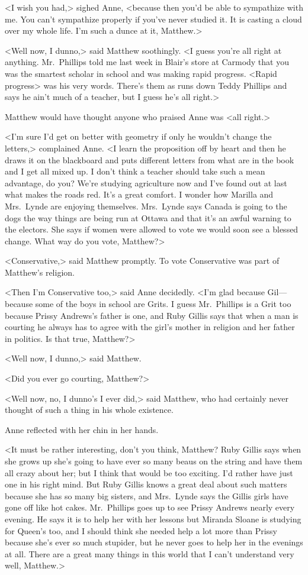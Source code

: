 <I wish you had,> sighed Anne, <because then you'd be able to sympathize with me. You can't sympathize properly if you've never studied it. It is casting a cloud over my whole life. I'm such a dunce at it, Matthew.>

<Well now, I dunno,> said Matthew soothingly. <I guess you're all right at anything. Mr.~Phillips told me last week in Blair's store at Carmody that you was the smartest scholar in school and was making rapid progress. <Rapid progress> was his very words. There's them as runs down Teddy Phillips and says he ain't much of a teacher, but I guess he's all right.>

Matthew would have thought anyone who praised Anne was <all right.>

<I'm sure I'd get on better with geometry if only he wouldn't change the letters,> complained Anne. <I learn the proposition off by heart and then he draws it on the blackboard and puts different letters from what are in the book and I get all mixed up. I don't think a teacher should take such a mean advantage, do you? We're studying agriculture now and I've found out at last what makes the roads red. It's a great comfort. I wonder how Marilla and Mrs.~Lynde are enjoying themselves. Mrs.~Lynde says Canada is going to the dogs the way things are being run at Ottawa and that it's an awful warning to the electors. She says if women were allowed to vote we would soon see a blessed change. What way do you vote, Matthew?>

<Conservative,> said Matthew promptly. To vote Conservative was part of Matthew's religion.

<Then I'm Conservative too,> said Anne decidedly. <I'm glad because Gil—because some of the boys in school are Grits. I guess Mr.~Phillips is a Grit too because Prissy Andrews's father is one, and Ruby Gillis says that when a man is courting he always has to agree with the girl's mother in religion and her father in politics. Is that true, Matthew?>

<Well now, I dunno,> said Matthew.

<Did you ever go courting, Matthew?>

<Well now, no, I dunno's I ever did,> said Matthew, who had certainly never thought of such a thing in his whole existence.

Anne reflected with her chin in her hands.

<It must be rather interesting, don't you think, Matthew? Ruby Gillis says when she grows up she's going to have ever so many beaus on the string and have them all crazy about her; but I think that would be too exciting. I'd rather have just one in his right mind. But Ruby Gillis knows a great deal about such matters because she has so many big sisters, and Mrs.~Lynde says the Gillis girls have gone off like hot cakes. Mr.~Phillips goes up to see Prissy Andrews nearly every evening. He says it is to help her with her lessons but Miranda Sloane is studying for Queen's too, and I should think she needed help a lot more than Prissy because she's ever so much stupider, but he never goes to help her in the evenings at all. There are a great many things in this world that I can't understand very well, Matthew.>

